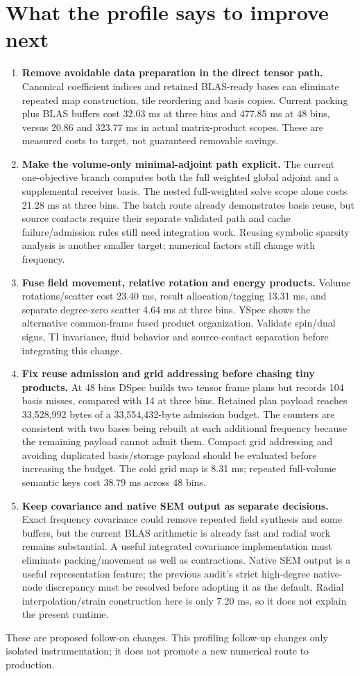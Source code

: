 \clearpage\section{What the profile says to improve next}
\begin{enumerate}
\item \textbf{Remove avoidable data preparation in the direct tensor path.} Canonical coefficient indices and retained BLAS-ready bases can eliminate repeated map construction, tile reordering and basis copies. Current packing plus BLAS buffers cost 32.03 ms at three bins and 477.85 ms at 48 bins, versus 20.86 and 323.77 ms in actual matrix-product scopes. These are measured costs to target, not guaranteed removable savings.
\item \textbf{Make the volume-only minimal-adjoint path explicit.} The current one-objective branch computes both the full weighted global adjoint and a supplemental receiver basis. The nested full-weighted solve scope alone costs 21.28 ms at three bins. The batch route already demonstrates basis reuse, but source contacts require their separate validated path and cache failure/admission rules still need integration work. Reusing symbolic sparsity analysis is another smaller target; numerical factors still change with frequency.
\item \textbf{Fuse field movement, relative rotation and energy products.} Volume rotations/scatter cost 23.40 ms, result allocation/tagging 13.31 ms, and separate degree-zero scatter 4.64 ms at three bins. YSpec shows the alternative common-frame fused product organization. Validate spin/dual signs, TI invariance, fluid behavior and source-contact separation before integrating this change.
\item \textbf{Fix reuse admission and grid addressing before chasing tiny products.} At 48 bins DSpec builds two tensor frame plans but records 104 basis misses, compared with 14 at three bins. Retained plan payload reaches 33,528,992 bytes of a 33,554,432-byte admission budget. The counters are consistent with two bases being rebuilt at each additional frequency because the remaining payload cannot admit them. Compact grid addressing and avoiding duplicated basis/storage payload should be evaluated before increasing the budget. The cold grid map is 8.31 ms; repeated full-volume semantic keys cost 38.79 ms across 48 bins.
\item \textbf{Keep covariance and native SEM output as separate decisions.} Exact frequency covariance could remove repeated field synthesis and some buffers, but the current BLAS arithmetic is already fast and radial work remains substantial. A useful integrated covariance implementation must eliminate packing/movement as well as contractions. Native SEM output is a useful representation feature; the previous audit's strict high-degree native-node discrepancy must be resolved before adopting it as the default. Radial interpolation/strain construction here is only 7.20 ms, so it does not explain the present runtime.
\end{enumerate}
These are proposed follow-on changes. This profiling follow-up changes only isolated instrumentation; it does not promote a new numerical route to production.

